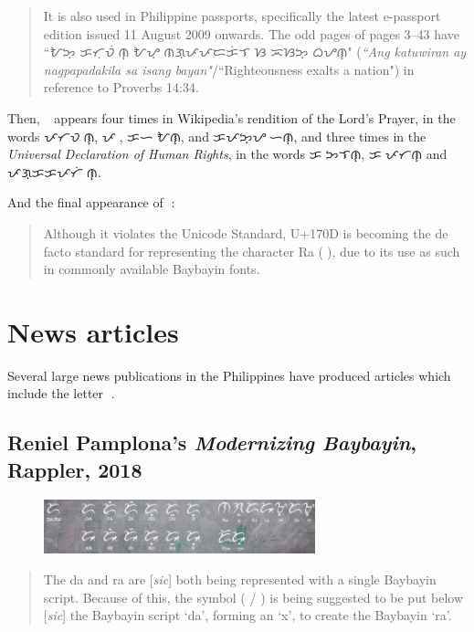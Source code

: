 \documentclass[a4paper,pagesize,openany,14pt,parskip=never]{scrbook}
\newcommand{\≈}{$\approx$}
\newcommand{\ra}{{\baybayin ᜍ}}
\begin{document}
\begin{quote}
    It is also used in Philippine passports, specifically the latest e-passport edition issued 11 August 2009 onwards. The odd pages of pages 3–43 have ``{\baybayin ᜀᜅ᜔ ᜃᜆᜓᜏᜒᜍᜈ᜔ ᜀᜌ᜔ ᜈᜄ᜔ᜉᜉᜇᜃᜒᜎ ᜐ ᜁᜐᜅ᜔ ᜊᜌᜈ᜔}" ({\em ``Ang katuwiran ay nagpapadakila sa isang bayan"}/``Righteousness exalts a nation") in reference to Proverbs 14:34.
\end{quote}

Then, \ra\ appears four times in Wikipedia's rendition of the Lord's Prayer, in the words {\baybayin ᜉᜆᜏᜍᜒᜈ᜔}, {\baybayin ᜉᜍ}, {\baybayin ᜃᜑᜍᜒᜀᜈ᜔}, and {\baybayin ᜃᜉᜅ᜔ᜌᜍᜒᜑᜈ᜔}, and three times in the {\em Universal Declaration of Human Rights}, in the words {\baybayin ᜃᜍᜅᜎᜈ᜔}, {\baybayin ᜃᜍᜉᜆᜈ᜔} and {\baybayin ᜉᜄ᜔ᜃᜃᜉᜆᜒᜍᜈ᜔}.

And the final appearance of \ra:

\begin{quote}
    Although it violates the Unicode Standard, U+170D is becoming the de facto standard for representing the character Ra ({\baybayin ᜍ}), due to its use as such in commonly available Baybayin fonts.
\end{quote}

\section{News articles}

Several large news publications in the Philippines have produced articles which include the letter {\baybayin ᜍ}.

\subsection{Reniel Pamplona's {\em Modernizing Baybayin}, Rappler, 2018}

\begin{figure}[H]
\includegraphics[width=0.7\textwidth]{RapplerRA}
\end{figure}

\begin{quote}
    The da and ra are [{\em sic}] both being represented with a single Baybayin script. Because of this, the symbol ( / ) is being suggested to be put below [{\em sic}] the Baybayin script ‘da’, forming an ‘x’, to create the Baybayin ‘ra’.
\end{quote}
\end{document}
